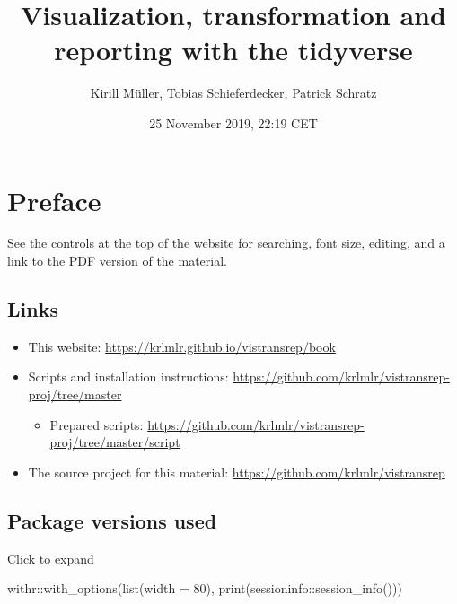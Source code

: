 \documentclass[]{book}
\title{Visualization, transformation and reporting with the tidyverse}
\author{Kirill Müller, Tobias Schieferdecker, Patrick Schratz}
\date{25 November 2019, 22:19 CET}
\newenvironment{Shaded}{}{}
\newcommand{\DataTypeTok}[1]{#1}
\newcommand{\DecValTok}[1]{#1}
\newcommand{\KeywordTok}[1]{\textcolor[rgb]{0.00,0.00,1.00}{#1}}
\newcommand{\NormalTok}[1]{#1}
\newcommand{\OperatorTok}[1]{#1}
\providecommand{\tightlist}{%
  \setlength{\itemsep}{0pt}\setlength{\parskip}{0pt}}
\begin{document}
\maketitle

{
\setcounter{tocdepth}{1}
\tableofcontents
}
\hypertarget{preface}{%
\chapter*{Preface}\label{preface}}

See the controls at the top of the website for searching, font size, editing, and a link to the PDF version of the material.

\hypertarget{links}{%
\section*{Links}\label{links}}

\begin{itemize}
\item
  This website: \url{https://krlmlr.github.io/vistransrep/book}
\item
  Scripts and installation instructions: \url{https://github.com/krlmlr/vistransrep-proj/tree/master}

  \begin{itemize}
  \tightlist
  \item
    Prepared scripts: \url{https://github.com/krlmlr/vistransrep-proj/tree/master/script}
  \end{itemize}
\item
  The source project for this material: \url{https://github.com/krlmlr/vistransrep}
\end{itemize}

\hypertarget{package-versions-used}{%
\section*{Package versions used}\label{package-versions-used}}

Click to expand

\begin{Shaded}
\begin{Highlighting}[]
\NormalTok{withr}\OperatorTok{::}\KeywordTok{with_options}\NormalTok{(}\KeywordTok{list}\NormalTok{(}\DataTypeTok{width =} \DecValTok{80}\NormalTok{), }\KeywordTok{print}\NormalTok{(sessioninfo}\OperatorTok{::}\KeywordTok{session_info}\NormalTok{()))}
\end{Highlighting}
\end{Shaded}
\end{document}

